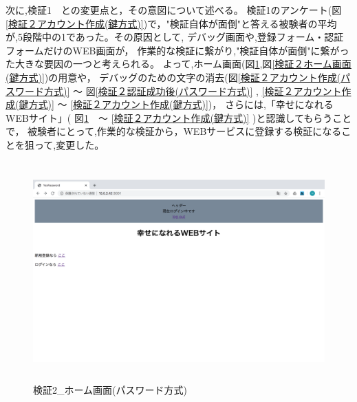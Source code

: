     次に,検証1　との変更点と，その意図について述べる。
    検証1のアンケート(図\ref{検証２アカウント作成(鍵方式)})で，"検証自体が面倒"と答える被験者の平均が,5段階中の1であった。その原因として,
    デバッグ画面や,登録フォーム・認証フォームだけのWEB画面が，
    作業的な検証に繋がり,"検証自体が面倒"に繋がった大きな要因の一つと考えられる。
    よって,ホーム画面(図\ref{検証２ホーム画面(パスワード方式)},図\ref{検証２ホーム画面(鍵方式)})の用意や，
    デバッグのための文字の消去(図\ref{検証２アカウント作成(パスワード方式)} 〜 図\ref{検証２認証成功後(パスワード方式)} , \ref{検証２アカウント作成(鍵方式)} 〜 \ref{検証２アカウント作成(鍵方式)})，
    さらには,「幸せになれるWEBサイト」( 図\ref{検証２ホーム画面(パスワード方式)}　〜 \ref{検証２アカウント作成(鍵方式)} )と認識してもらうことで，
    被験者にとって,作業的な検証から，WEBサービスに登録する検証になることを狙って,変更した。









    \vspace{4cm}%
    \begin{figure}[H]
        \includegraphics[height=8.4cm]{./fig/chapter4/inspect_2/password_screnn/home.png}
        \caption{検証2\_ホーム画面(パスワード方式)}
        \label{検証２ホーム画面(パスワード方式)}
    \end{figure}


